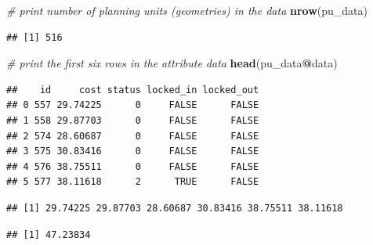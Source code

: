 \documentclass[12pt,]{book}
\newenvironment{Shaded}{\begin{snugshade}}{\end{snugshade}}
\newcommand{\CommentTok}[1]{\textcolor[rgb]{0.56,0.35,0.01}{\textit{#1}}}
\newcommand{\KeywordTok}[1]{\textcolor[rgb]{0.13,0.29,0.53}{\textbf{#1}}}
\newcommand{\NormalTok}[1]{#1}
\newcommand{\OperatorTok}[1]{\textcolor[rgb]{0.81,0.36,0.00}{\textbf{#1}}}
\begin{document}
\begin{Shaded}
\begin{Highlighting}[]
\CommentTok{# print number of planning units (geometries) in the data}
\KeywordTok{nrow}\NormalTok{(pu_data)}
\end{Highlighting}
\end{Shaded}

\begin{verbatim}
## [1] 516
\end{verbatim}

\begin{Shaded}
\begin{Highlighting}[]
\CommentTok{# print the first six rows in the attribute data}
\KeywordTok{head}\NormalTok{(pu_data}\OperatorTok{@}\NormalTok{data)}
\end{Highlighting}
\end{Shaded}

\begin{verbatim}
##    id     cost status locked_in locked_out
## 0 557 29.74225      0     FALSE      FALSE
## 1 558 29.87703      0     FALSE      FALSE
## 2 574 28.60687      0     FALSE      FALSE
## 3 575 30.83416      0     FALSE      FALSE
## 4 576 38.75511      0     FALSE      FALSE
## 5 577 38.11618      2      TRUE      FALSE
\end{verbatim}

\begin{Shaded}
\end{Shaded}

\begin{verbatim}
## [1] 29.74225 29.87703 28.60687 30.83416 38.75511 38.11618
\end{verbatim}

\begin{Shaded}
\end{Shaded}

\begin{verbatim}
## [1] 47.23834
\end{verbatim}
\end{document}
